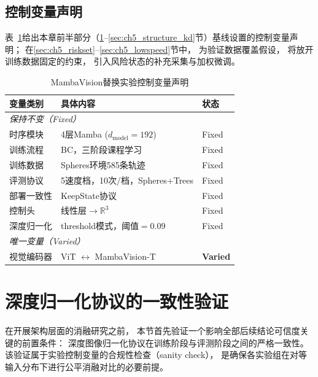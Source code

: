 \subsection{控制变量声明}

\FloatBarrier

表~\ref{tab:control_var}给出本章前半部分（\ref{sec:ch5_norm}--\ref{sec:ch5_structure_kd}节）基线设置的控制变量声明；
在\ref{sec:ch5_riskset}--\ref{sec:ch5_lowspeed}节中，
为验证数据覆盖假设，
将放开训练数据固定的约束，
引入风险状态的补充采集与加权微调。

\begin{table}[htbp]
\centering
\caption{MambaVision替换实验控制变量声明}
\label{tab:control_var}
\begin{tabular}{p{3.5cm}p{5.5cm}p{2.5cm}}
\toprule
\textbf{变量类别} & \textbf{具体内容} & \textbf{状态} \\
\midrule
\multicolumn{3}{l}{\textit{保持不变（Fixed）}} \\
\quad 时序模块 & 4层Mamba ($d_{\text{model}}=192$) & Fixed \\
\quad 训练流程 & BC，三阶段课程学习 & Fixed \\
\quad 训练数据 & Spheres环境585条轨迹 & Fixed \\
\quad 评测协议 & 5速度档，10次/档，Spheres+Trees & Fixed \\
\quad 部署一致性 & KeepState协议 & Fixed \\
\quad 控制头 & 线性层$\rightarrow$$\mathbb{R}^3$ & Fixed \\
\quad 深度归一化 & threshold模式，阈值$=0.09$ & Fixed \\
\midrule
\multicolumn{3}{l}{\textit{唯一变量（Varied）}} \\
\quad 视觉编码器 & ViT $\leftrightarrow$ MambaVision-T & \textbf{Varied} \\
\bottomrule
\end{tabular}
\end{table}

\FloatBarrier


\section{深度归一化协议的一致性验证}
\label{sec:ch5_norm}

在开展架构层面的消融研究之前，
本节首先验证一个影响全部后续结论可信度关键的前置条件：
深度图像归一化协议在训练阶段与评测阶段之间的严格一致性。
该验证属于实验控制变量的合规性检查（sanity check），
是确保各实验组在对等输入分布下进行公平消融对比的必要前提。

